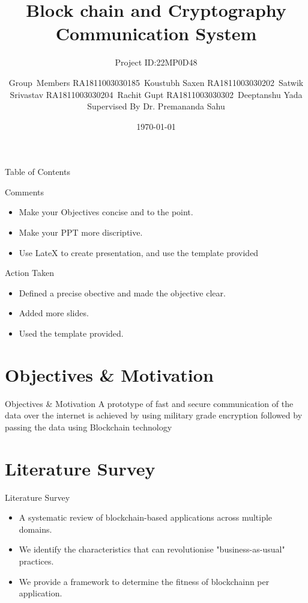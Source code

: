 \documentclass{beamer}
\title[22MP0D48]{Block chain and Cryptography Communication System}
\subtitle{Project ID:22MP0D48\\}
\author[Review -II]{Group~Members RA1811003030185~Koustubh Saxen RA1811003030202~Satwik Srivastav  RA1811003030204~Rachit Gupt RA1811003030302~Deeptanshu Yada  {Supervised By Dr. Premananda Sahu}}
\institute[]{Department of Computer Science \& Engineerin Faculty of Engineering \& Technolog SRM Institute of Science \& Technology}
\date{\today}
\begin{document}
	\begin{frame}
		\maketitle
		\date{}
	\end{frame}
	\begin{frame}[allowframebreaks]{Table of Contents}
		\tableofcontents[sections={1-7}]
		\tableofcontents[sections={8-10}]
	\end{frame}
	
	\begin{frame}{Comments}
		\LARGE
		\begin{itemize}
			\item Make your Objectives concise and to the point.
			\item Make your PPT more discriptive.
			\item Use LateX to create presentation, and use the template provided
			\medskip
		\end{itemize}
	\end{frame}
	\begin{frame}{Action Taken}
		\begin{itemize}
			\LARGE
			\item Defined a precise obective and made the objective clear.
			\item Added more slides.
			\item Used the template provided.
		\end{itemize}
	\end{frame}

	\section{Objectives \& Motivation}
	\begin{frame}{Objectives \& Motivation}
		\LARGE
	A prototype of fast and secure communication of the data over the internet is achieved by using military grade encryption followed by passing the data using Blockchain technology	
	\end{frame}

	\section{Literature Survey}
	\begin{frame}{Literature Survey}
	\bigskip
	\normalsize
		\begin{itemize}
			\item A systematic review of blockchain-based applications across multiple domains.
			\medskip
			\item We identify the characteristics that can revolutionise "business-as-usual" practices.
			\medskip
			\item We provide a framework to determine the fitness of blockchainn per application.
			\medskip
		\end{itemize}
	\end{frame}
	
\end{document}
